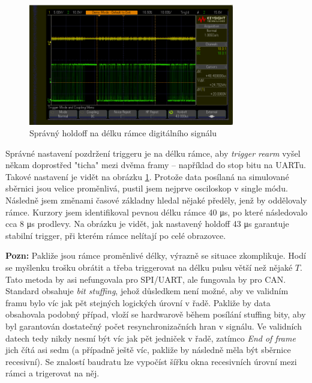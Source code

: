 \documentclass[twoside]{article}
\begin{document}
\begin{figure}[htbp]
	\centering
	\includegraphics[width=0.8\textwidth]{digital_glitch_correct_holdoff.png                    }
	\caption{Správný holdoff na délku rámce digitálního signálu}
	\label{fig:good_holdoff}
\end{figure}
Správné nastavení pozdržení triggeru je na délku rámce, aby \textit{trigger rearm} vyšel někam doprostřed "ticha" mezi dvěma framy -- například do stop bitu na UARTu. 
Takové nastavení je vidět na obrázku \ref{fig:good_holdoff}. Protože data posílaná na simulované sběrnici jsou velice proměnlivá, pustil jsem
nejprve osciloskop v single módu. Následně jsem změnami časové základny hledal nějaké předěly, jenž by oddělovaly rámce.
Kurzory jsem identifikoval pevnou délku rámce 40 \si{\micro\second}, po které následovalo cca 8 \si{\micro\second} prodlevy.
Na obrázku je vidět, jak nastavený holdoff 43 \si{\micro\second} garantuje stabilní trigger, při kterém rámce nelítají po celé obrazovce.

\textbf{Pozn:} Pakliže jsou rámce proměnlivé délky, výrazně se situace zkomplikuje. Hodí se myšlenku trošku obrátit a třeba triggerovat
na délku pulsu větší než nějaké $T$. Tato metoda by asi nefungovala pro SPI/UART, ale fungovala by pro CAN. Standard obsahuje \textit{bit stuffing},
jehož důsledkem není možné, aby ve validním framu bylo víc jak pět stejných logických úrovní v řadě. Pakliže by data obsahovala podobný případ,
vloží se hardwarově během posílání stuffing bity, aby byl garantován dostatečný počet resynchronizačních hran v signálu.
Ve validních datech tedy nikdy nesmí být víc jak pět jedniček v řadě, zatímco \textit{End of frame} jich čítá asi sedm
(a případně ještě víc, pakliže by následně měla být sběrnice recesivní). Se znalostí baudratu lze vypočíst šířku okna recesivních úrovní
mezi rámci a trigerovat na něj.
\end{document}
